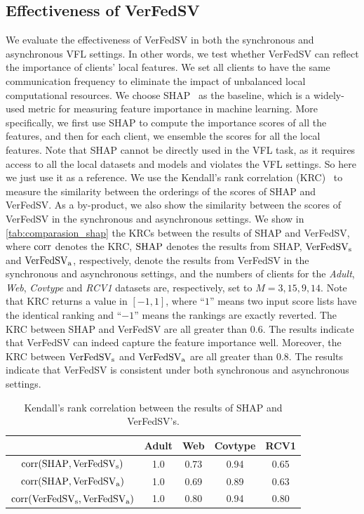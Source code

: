 \subsection{Effectiveness of VerFedSV} \label{sec:8-8-4}
We evaluate the effectiveness of VerFedSV in both the synchronous and asynchronous VFL settings. In other words, we test whether VerFedSV can reflect the importance of clients' local features. We set all clients to have the same communication frequency to eliminate the impact of unbalanced local computational resources. We choose SHAP~\cite{lundberg2017unified} as the baseline, which is a widely-used metric for measuring feature importance in machine learning. More specifically, we first use SHAP to compute the importance scores of all the features, and then for each client, we ensemble the scores for all the local features. Note that SHAP cannot be directly used in the VFL task, as it requires access to all the local datasets and models and violates the VFL settings. So here we just use it as a reference. We use the Kendall's rank correlation (KRC)~\cite{kendall1938new} to measure the similarity between the orderings of the scores of SHAP and VerFedSV. As a by-product, we also show the similarity between the scores of VerFedSV in the synchronous and asynchronous settings. We show in \autoref{tab:comparasion_shap} the KRCs between the results of SHAP and VerFedSV, where $\mathrm{corr}$ denotes the KRC, $\textrm{SHAP}$ denotes the results from SHAP, $\textrm{VerFedSV}_{\textrm{s}}$ and $\textrm{VerFedSV}_{\textrm{a}}$, respectively, denote the results from VerFedSV in the synchronous and asynchronous settings, and the numbers of clients for the \emph{Adult}, \emph{Web}, \emph{Covtype} and \emph{RCV1} datasets are, respectively, set to $M = 3, 15, 9, 14$. Note that KRC returns a value in $[-1, 1]$, where ``$1$'' means two input score lists have the identical ranking and ``$-1$'' means the rankings are exactly reverted. The KRC between SHAP and VerFedSV are all greater than $0.6$. The results indicate that VerFedSV can indeed capture the feature importance well. Moreover, the KRC between $\textrm{VerFedSV}_{\textrm{s}}$ and $\textrm{VerFedSV}_{\textrm{a}}$ are all greater than 0.8. The results indicate that VerFedSV is consistent under both synchronous and asynchronous settings.

\begin{table}[t]
    \centering
    \begin{tabular}{ccccc}
    \toprule
                                & Adult & Web   & Covtype   & RCV1\\ \midrule
    $\mathrm{corr}(\textrm{SHAP}, \textrm{VerFedSV}_{\textrm{s}})$    & 1.0   & 0.73  & 0.94      & 0.65\\
    $\mathrm{corr}(\textrm{SHAP}, \textrm{VerFedSV}_{\textrm{a}})$   & 1.0   & 0.69  & 0.89      & 0.63\\
    $\mathrm{corr}(\textrm{VerFedSV}_{\textrm{s}}, \textrm{VerFedSV}_{\textrm{a}})$    & 1.0   & 0.80  & 0.94      & 0.80\\
    \bottomrule
    \end{tabular}
    \caption{Kendall's rank correlation between the results of SHAP and VerFedSV's.}
    \label{tab:comparasion_shap}
\end{table}

